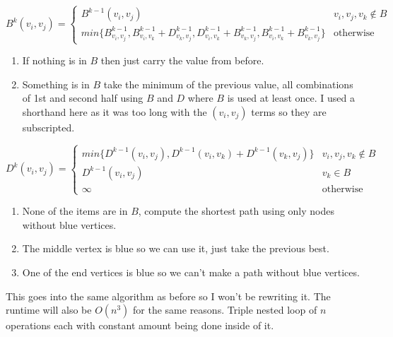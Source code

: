 \documentclass{article}
\begin{document}
\begin{enumerate}[a.]
\[
    B^k(v_i, v_j) =
\begin{cases}
    B^{k-1}(v_i,v_j)                        & v_i, v_j, v_k \notin B \\
    min\{B^{k-1}_{v_i,v_j}, B^{k-1}_{v_i,v_k} + D^{k-1}_{v_k,v_j}, D^{k-1}_{v_i,v_k} + B^{k-1}_{v_k,v_j}, B^{k-1}_{v_i,v_k} + B^{k-1}_{v_k,v_j}\} & \text{otherwise}
\end{cases}
\]
\newline
\begin{enumerate}[1)]
\item If nothing is in $B$ then just carry the value from before.
\item Something is in $B$ take the minimum of the previous value, all combinations of 1st and second half using $B$ and $D$  where $B$ is used at least once.
I used a shorthand here as it was too long with the $(v_i,v_j)$ terms so they are subscripted.
\end{enumerate}

\[
    D^k(v_i, v_j) =
\begin{cases}
    min\{D^{k-1}(v_i,v_j), D^{k-1}(v_i,v_k) + D^{k-1}(v_k,v_j)\}    & v_i, v_j, v_k \notin B \\
    D^{k-1}(v_i,v_j)                                                & v_k \in B \\
    \infty                                                          & \text{otherwise}
\end{cases}
\]
\begin{enumerate}[1)]
\item None of the items are in $B$, compute the shortest path using only nodes without blue vertices.
\item The middle vertex is blue so we can use it, just take the previous best.
\item One of the end vertices is blue so we can't make a path without blue vertices.
\end{enumerate}
\end{enumerate}

This goes into the same algorithm as before so I won't be rewriting it. The runtime will also be $O(n^3)$ for the same reasons.
Triple nested loop of $n$ operations each with constant amount being done inside of it.

\newpage
\end{document}
